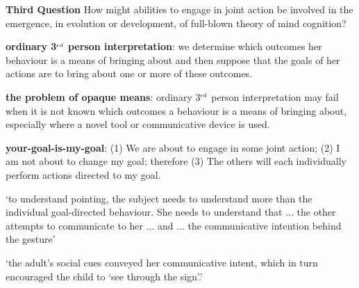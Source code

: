 \documentclass[11pt]{extarticle}
\begin{document}
\begin{multicols}{3}
{\Large
\textbf{Third Question}
How might abilities to engage in joint action be involved in the emergence, in evolution or development, of full-blown theory of mind cognition?
}

\textbf{ordinary 3$^{\textrm{\tiny rd}}$ person interpretation}: we determine which outcomes her behaviour is a means of bringing about and then suppose that the goals of her actions are to bring about one or more of these outcomes.

\textbf{the problem of opaque means}: ordinary 3$^{\textrm{\tiny rd}}$ person interpretation may fail when it is not known which outcomes a behaviour is a means of bringing about, especially where a novel tool or communicative device is used.

\textbf{your-goal-is-my-goal}: (1) We are about to engage in some joint action; (2) I am not about to change my goal; therefore (3) The others will each individually perform actions directed to my goal.


`to understand pointing, the subject needs to understand more than the individual goal-directed behaviour. She needs to understand that ... the other attempts to communicate to her ...  and ... the communicative intention behind the gesture'\citep{Moll:2007gu}

`the adult’s social cues conveyed her communicative intent, which in turn encouraged the child to `see through the sign'.'
\citep%
{leekam_adults_2010}

\footnotesize 


\end{multicols}
\end{document}
